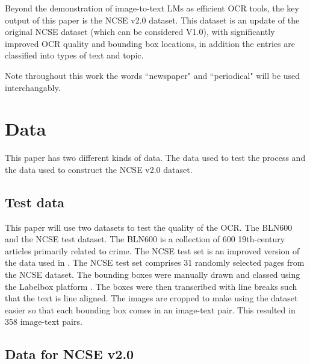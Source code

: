 \documentclass{article} %
\begin{document}
Beyond the demonstration of image-to-text LMs as efficient OCR tools, the key output of this paper is the NCSE v2.0 dataset. This dataset is an update of the original NCSE dataset (which can be considered V1.0), with significantly improved OCR quality and bounding box locations, in addition the entries are classified into types of text and topic.

Note throughout this work the words ``newspaper" and ``periodical" will be used interchangably.

\FloatBarrier
\section{Data}

This paper has two different kinds of data. The data used to test the process and the data used to construct the NCSE v2.0 dataset.

\subsection{Test data}

This paper will use two datasets to test the quality of the OCR. The BLN600 \cite{booth_bln600_2024} and the NCSE test dataset. The BLN600 is a collection of 600 19th-century articles primarily related to crime. The NCSE test set is an improved version of the data used in \cite{bourne_clocr-c_2024, bourne_scrambled_2024-1}. The NCSE test set comprises 31 randomly selected pages from the NCSE dataset. The bounding boxes were manually drawn and classed using the Labelbox platform \cite{labelbox_labelbox_2025}. The boxes were then transcribed with line breaks such that the text is line aligned. The images are cropped to make using the dataset easier so that each bounding box comes in an image-text pair. This resulted in 358 image-text pairs. 


\subsection{Data for NCSE v2.0}
\end{document}
